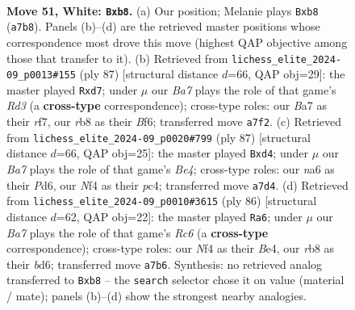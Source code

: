 \documentclass[11pt]{article}
\begin{document}
\clearpage

\begin{figure}[p]\centering
\begin{subfigure}{0.46\textwidth}\centering
\resizebox{\linewidth}{!}{%
\newchessgame
\chessboard[
  setfen={1rkb4/Bp5p/n5pP/p4p2/r4N2/3R2P1/7K/6R1 w - - 0 51},
  showmover=false,
  pgfstyle=straightmove, color=movearrow, markmove={a7-b8}
]}
\caption{}
\end{subfigure}\hfill
\begin{subfigure}{0.46\textwidth}\centering
\resizebox{\linewidth}{!}{%
\newchessgame
\chessboard[
  setfen={7r/3R1R2/3r1bpk/3B3p/2Pp3P/3P2PK/8/8 b - - 11 44},
  showmover=false,
  pgfstyle=straightmove, color=movearrow, markmove={d6-d7}
]}
\caption{}
\end{subfigure}
\\[4pt]
\begin{subfigure}{0.46\textwidth}\centering
\resizebox{\linewidth}{!}{%
\newchessgame
\chessboard[
  setfen={6k1/7p/3p4/4bPP1/1pPR2NK/1P6/r5r1/3R4 b - - 0 44},
  showmover=false,
  pgfstyle=straightmove, color=movearrow, markmove={e5-d4}
]}
\caption{}
\end{subfigure}\hfill
\begin{subfigure}{0.46\textwidth}\centering
\resizebox{\linewidth}{!}{%
\newchessgame
\chessboard[
  setfen={3r2k1/4rp2/2Rb2p1/p2P4/Pp2B3/5K2/8/2R5 w - - 0 44},
  showmover=false,
  pgfstyle=straightmove, color=movearrow, markmove={c6-a6}
]}
\caption{}
\end{subfigure}
\caption{\textbf{Move 51, White: \texttt{Bxb8}.} (a) Our position; Melanie plays \texttt{Bxb8} (\texttt{a7b8}). Panels (b)--(d) are the retrieved master positions whose correspondence most drove this move (highest QAP objective among those that transfer to it). (b) Retrieved from \texttt{lichess\_elite\_2024-09\_p0013\#155} (ply 87) [structural distance $d$=66, QAP obj=29]: the master played \texttt{Rxd7}; under $\mu$ our \emph{Ba7} plays the role of that game's \emph{Rd3} (a \textbf{cross-type} correspondence); cross-type roles: our \emph{B}a7 as their \emph{r}f7, our \emph{r}b8 as their \emph{B}f6; transferred move \texttt{a7f2}. (c) Retrieved from \texttt{lichess\_elite\_2024-09\_p0020\#799} (ply 87) [structural distance $d$=66, QAP obj=25]: the master played \texttt{Bxd4}; under $\mu$ our \emph{Ba7} plays the role of that game's \emph{Be4}; cross-type roles: our \emph{n}a6 as their \emph{P}d6, our \emph{N}f4 as their \emph{p}c4; transferred move \texttt{a7d4}. (d) Retrieved from \texttt{lichess\_elite\_2024-09\_p0010\#3615} (ply 86) [structural distance $d$=62, QAP obj=22]: the master played \texttt{Ra6}; under $\mu$ our \emph{Ba7} plays the role of that game's \emph{Rc6} (a \textbf{cross-type} correspondence); cross-type roles: our \emph{N}f4 as their \emph{B}e4, our \emph{r}b8 as their \emph{b}d6; transferred move \texttt{a7b6}. Synthesis: no retrieved analog transferred to \texttt{Bxb8} -- the \texttt{search} selector chose it on value (material / mate); panels (b)--(d) show the strongest nearby analogies.}
\label{fig:thought-m100}
\end{figure}
\end{document}

